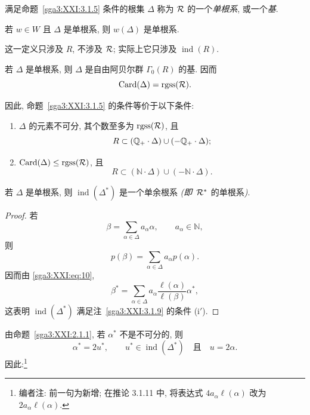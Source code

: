 \begin{definition}\label{sga3:XXI:3.1.6}
满足命题~\ref{sga3:XXI:3.1.5} 条件的根集 \(\Delta\) 称为 \(\mathcal{R}\) 的一个\emph{单根系}, 或一个\emph{基}.
\end{definition}

若 \(w\in W\) 且 \(\Delta\) 是单根系, 则 \(w(\Delta)\) 是单根系.

\begin{remark}\label{sga3:XXI:3.1.7}
这一定义只涉及 \(R\), 不涉及 \(\mathcal{R}\); 实际上它只涉及 \(\operatorname{ind}(R)\).
\end{remark}

\begin{remark}\label{sga3:XXI:3.1.8}
若 \(\Delta\) 是单根系, 则 \(\Delta\) 是自由阿贝尔群 \(\Gamma_0(R)\) 的基. 因而
\[
 \operatorname{Card}(\Delta)=\operatorname{rgss}(\mathcal{R}).
\]
\end{remark}

\begin{remark}\label{sga3:XXI:3.1.9}
因此, 命题~\ref{sga3:XXI:3.1.5} 的条件等价于以下条件:
\begin{enumerate}
\item[(i\('\))] \(\Delta\) 的元素不可分, 其个数至多为 \(\operatorname{rgss}(\mathcal{R})\), 且
  \[
   R\subset(\mathbb{Q}_{+}\cdot\Delta)\cup(-\mathbb{Q}_{+}\cdot\Delta);
  \]
\item[(ii\('\))] \(\operatorname{Card}(\Delta)\leq\operatorname{rgss}(\mathcal{R})\), 且
  \[
   R\subset(\mathbb N\cdot\Delta)\cup(-\mathbb N\cdot\Delta).
  \]
\end{enumerate}
\end{remark}

\begin{corollary}\label{sga3:XXI:3.1.10}
若 \(\Delta\) 是单根系, 则 \(\operatorname{ind}(\Delta^\ast)\) 是一个单余根系 \emph{(即}\ \(\mathcal{R}^\ast\) 的单根系\emph{)}.
\end{corollary}
\begin{proof}
若
\[
 \beta=\sum_{\alpha\in\Delta}a_\alpha\alpha,
 \qquad a_\alpha\in\mathbb N,
\]
则
\[
 p(\beta)=\sum_{\alpha\in\Delta}a_\alpha p(\alpha).
\]
因而由 \eqref{sga3:XXI:eq:10},
\[
 \beta^\ast
 =\sum_{\alpha\in\Delta}
   a_\alpha\frac{\ell(\alpha)}{\ell(\beta)}\alpha^\ast,
\]
这表明 \(\operatorname{ind}(\Delta^\ast)\) 满足注~\ref{sga3:XXI:3.1.9} 的条件 (i\('\)).
\end{proof}

由命题~\ref{sga3:XXI:2.1.1}, 若 \(\alpha^\ast\) 不是不可分的, 则
\[
 \alpha^\ast=2u^\ast,
 \qquad
 u^\ast\in\operatorname{ind}(\Delta^\ast)
 \quad\text{且}\quad
 u=2\alpha.
\]
因此:\footnote{编者注: 前一句为新增; 在推论 3.1.11 中, 将表达式 \(4a_\alpha\ell(\alpha)\) 改为 \(2a_\alpha\ell(\alpha)\).}

